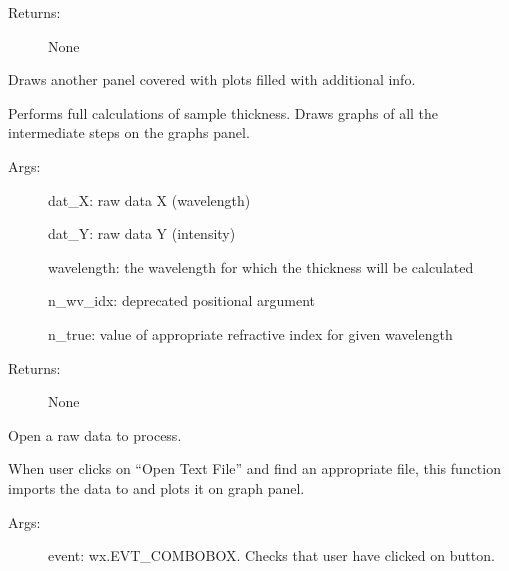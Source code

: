 \documentclass[letterpaper,10pt,english]{sphinxmanual}
\begin{document}
\begin{fulllineitems}
\begin{fulllineitems}
\begin{description}
\item[{Returns:}] \leavevmode
None

\end{description}

\end{fulllineitems}


\begin{fulllineitems}
\label{\detokenize{GUI:GUI.MyPanel.make_report}}
Draws another panel covered with plots filled with additional info.

Performs full calculations of sample thickness. Draws graphs of all the 
intermediate steps on the graphs panel.
\begin{description}
\item[{Args:}] \leavevmode
dat\_X: raw data X (wavelength)

dat\_Y: raw data Y (intensity)

wavelength: the wavelength for which the thickness will be calculated

n\_wv\_idx: deprecated positional argument

n\_true: value of appropriate refractive index for given wavelength

\item[{Returns:}] \leavevmode
None

\end{description}

\end{fulllineitems}


\begin{fulllineitems}
\label{\detokenize{GUI:GUI.MyPanel.on_open}}
Open a raw data to process.

When user clicks on “Open Text File” and find an appropriate file, 
this function imports the data to  and plots it on graph
panel.
\begin{description}
\item[{Args:}] \leavevmode
event: wx.EVT\_COMBOBOX. Checks that user have clicked on button.


\end{description}
\end{fulllineitems}
\end{fulllineitems}
\end{document}
